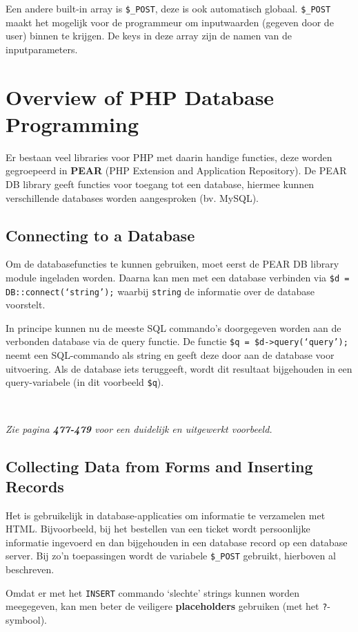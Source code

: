 \noindent Een andere built-in array is \texttt{\$\_POST}, deze is ook automatisch globaal. \texttt{\$\_POST} maakt het mogelijk voor de programmeur om inputwaarden (gegeven door de user) binnen te krijgen. De keys in deze array zijn de namen van de inputparameters.



\section{Overview of PHP Database Programming}
Er bestaan veel libraries voor PHP met daarin handige functies, deze worden gegroepeerd in \textbf{PEAR} (PHP Extension and Application Repository). De PEAR DB library geeft functies voor toegang tot een database, hiermee kunnen verschillende databases worden aangesproken (bv. MySQL).


\subsection{Connecting to a Database}
Om de databasefuncties te kunnen gebruiken, moet eerst de PEAR DB library module ingeladen worden. Daarna kan men met een database verbinden via \texttt{\$d = DB::connect(`string');} waarbij \texttt{string} de informatie over de database voorstelt.

In principe kunnen nu de meeste SQL commando's doorgegeven worden aan de verbonden database via de query functie. De functie \texttt{\$q = \$d->query(`query');} neemt een SQL-commando als string en geeft deze door aan de database voor uitvoering. Als de database iets teruggeeft, wordt dit resultaat bijgehouden in een query-variabele (in dit voorbeeld \texttt{\$q}).

~

\noindent \textit{Zie pagina \textbf{477-479} voor een duidelijk en uitgewerkt voorbeeld.}


\subsection{Collecting Data from Forms and Inserting Records}
Het is gebruikelijk in database-applicaties om informatie te verzamelen met HTML. Bijvoorbeeld, bij het bestellen van een ticket wordt persoonlijke informatie ingevoerd en dan bijgehouden in een database record op een database server. Bij zo'n toepassingen wordt de variabele \texttt{\$\_POST} gebruikt, hierboven al beschreven.

Omdat er met het \texttt{INSERT} commando `slechte' strings kunnen worden meegegeven, kan men beter de veiligere \textbf{placeholders} gebruiken (met het \texttt{?}-symbool).

